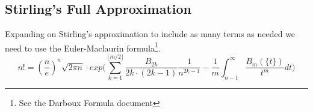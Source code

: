 \documentclass[a4paper]{article}
\begin{document}
    \subsection{Stirling's Full Approximation}\label{subsec:stirling's-full-approximation}
    \begin{theorem}
        Expanding on Stirling's approximation to include as many terms as needed we need to use the Euler-Maclaurin formula\footnote{See the Darboux Formula document}.
        \begin{equation}
            \boxed{
                n! = (\frac{n}{e})^n \sqrt{2\pi n} \cdot
                exp \Big( \sum_{k=1}^{\lfloor m/2 \rfloor} \frac{B_{2k}}{2k \cdot (2k-1)} \frac{1}{n^{2k-1}} - \frac{1}{m} \int_{n-1}^{\infty} \frac{B_m(\{t\})}{t^m}  dt \Big)
            }\label{eq:equation28}
        \end{equation}


\end{theorem}
\end{document}
